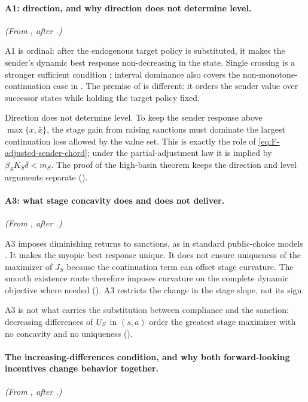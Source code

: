 \paragraph{A1: direction, and why direction does not determine level.} \emph{(From , after .)}

A1 is ordinal: after the endogenous target policy is substituted, it
makes the sender's dynamic best response non-decreasing in the state.
Single crossing is a stronger sufficient condition
\citep{MilgromShannon1994}; interval dominance also covers the
non-monotone-continuation case in . The premise of
 is different: it orders the sender value over
successor states while holding the target policy fixed.

Direction does not determine level. To keep the sender response above
$\max\{x,\bar x\}$, the stage gain from raising sanctions must dominate
the largest continuation loss allowed by the value set. This is exactly
the role of \eqref{eq:F-adjusted-sender-chord}; under the partial-adjustment law it
is implied by $\beta_SK_S\delta<m_S$. The proof of the high-basin theorem keeps the
direction and level arguments separate
().

\paragraph{A3: what stage concavity does and does not deliver.} \emph{(From , after .)}

A3 imposes diminishing returns to sanctions, as in standard
public-choice models \citep{Kaempfer1988,Eaton1992}. It makes the myopic
best response unique. It does not ensure uniqueness of the maximizer of
$J_S$ because the continuation term can offset stage curvature.
The smooth existence route therefore imposes curvature on the complete
dynamic objective where needed (). A3 restricts
the change in the stage slope, not its sign.

A3 is not what carries the substitution between compliance and the sanction: decreasing differences of $U_S$
in $(s,a)$ order the greatest stage maximizer with no concavity and no
uniqueness ().

\paragraph{The increasing-differences condition, and why both forward-looking incentives change behavior together.} \emph{(From , after .)}

